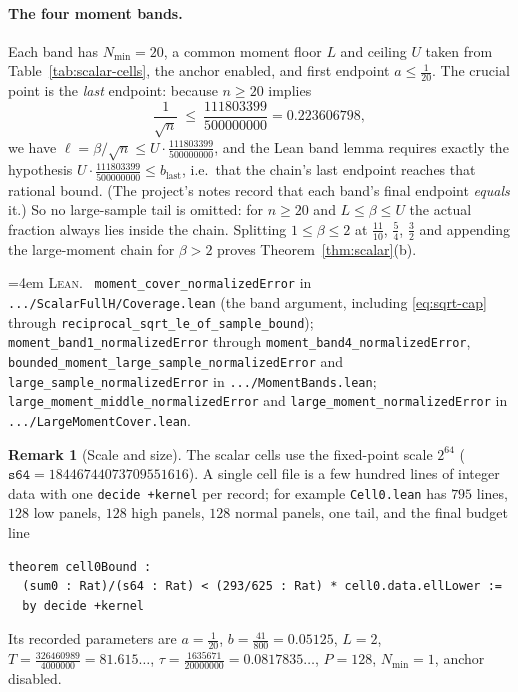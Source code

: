 \documentclass[10pt,a4paper]{article}
\theoremstyle{plain}
\theoremstyle{definition}
\newtheorem{remark}[theorem]{Remark}
\newcommand{\lean}[1]{\texttt{#1}}
\newcommand{\file}[1]{\texttt{#1}}
\newenvironment{leanref}%
  {\par\addvspace{3pt}\begingroup\sloppy\emergencystretch=4em
   \noindent\footnotesize\textsc{Lean.}\ \ignorespaces}%
  {\par\endgroup\addvspace{3pt}}
\begin{document}
\paragraph{The four moment bands.}
Each band has $N_{\min}=20$, a common moment floor $L$ and ceiling $U$ taken
from Table~\ref{tab:scalar-cells}, the anchor enabled, and first endpoint
$a\le\tfrac1{20}$. The crucial point is the \emph{last} endpoint: because
$n\ge20$ implies
\begin{equation}\label{eq:sqrt-cap}
  \frac1{\sqrt n} \ \le\ \frac{111803399}{500000000} = 0.223606798 ,
\end{equation}
we have $\ell=\beta/\sqrt n\le U\cdot\tfrac{111803399}{500000000}$, and the Lean
band lemma requires exactly the hypothesis
$U\cdot\tfrac{111803399}{500000000}\le b_{\text{last}}$, i.e.\ that the chain's
last endpoint reaches that rational bound. (The project's notes record that each
band's final endpoint \emph{equals} it.) So no large-sample tail is omitted: for
$n\ge20$ and $L\le\beta\le U$ the actual fraction always lies inside the chain.
Splitting $1\le\beta\le2$ at $\tfrac{11}{10}$,
$\tfrac54$, $\tfrac32$ and appending the large-moment chain for $\beta>2$
proves Theorem~\ref{thm:scalar}(b).

\begin{leanref}
\lean{moment\_cover\_normalizedError} in
\file{.../ScalarFullH/Coverage.lean} (the band argument, including
\eqref{eq:sqrt-cap} through
\lean{reciprocal\_sqrt\_le\_of\_sample\_bound});
\lean{moment\_band1\_normalizedError} through
\lean{moment\_band4\_normalizedError},
\lean{bounded\_moment\_large\_sample\_normalizedError} and
\lean{large\_sample\_normalizedError} in \file{.../MomentBands.lean};
\lean{large\_moment\_middle\_normalizedError} and
\lean{large\_moment\_normalizedError} in \file{.../LargeMomentCover.lean}.
\end{leanref}

\begin{remark}[Scale and size]
The scalar cells use the fixed-point scale $2^{64}$
($\lean{s64}=18446744073709551616$). A single cell file is a few hundred lines
of integer data with one \lean{decide +kernel} per record; for example
\file{Cell0.lean} has $795$ lines, $128$ low panels, $128$ high panels, $128$
normal panels, one tail, and the final budget line
\begin{verbatim}
theorem cell0Bound :
  (sum0 : Rat)/(s64 : Rat) < (293/625 : Rat) * cell0.data.ellLower :=
  by decide +kernel
\end{verbatim}
Its recorded parameters are $a=\tfrac1{20}$, $b=\tfrac{41}{800}=0.05125$,
$L=2$, $T=\tfrac{326460989}{4000000}=81.615\ldots$,
$\tau=\tfrac{1635671}{20000000}=0.0817835\ldots$, $P=128$, $N_{\min}=1$,
anchor disabled.
\end{remark}
\end{document}
